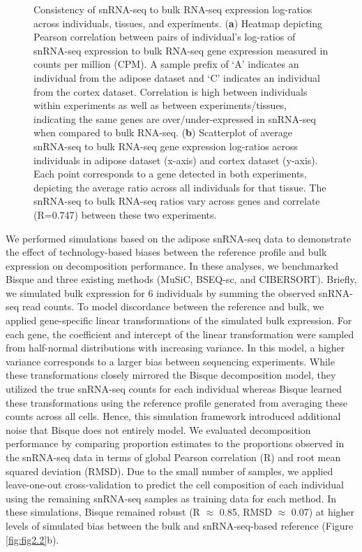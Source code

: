 \begin{figure}
\caption{
        Consistency of snRNA-seq to bulk RNA-seq expression log-ratios across individuals, tissues, and experiments.
        (\textbf{a}) Heatmap depicting Pearson correlation between pairs of individual’s log-ratios of snRNA-seq expression to bulk RNA-seq gene expression measured in counts per million (CPM). A sample prefix of ‘A’ indicates an individual from the adipose dataset and ‘C’ indicates an individual from the cortex dataset. Correlation is high between individuals within experiments as well as between experiments/tissues, indicating the same genes are over/under-expressed in snRNA-seq when compared to bulk RNA-seq.
        (\textbf{b}) Scatterplot of average snRNA-seq to bulk RNA-seq gene expression log-ratios across individuals in adipose dataset (x-axis) and cortex dataset (y-axis). Each point corresponds to a gene detected in both experiments, depicting the average ratio across all individuals for that tissue. The snRNA-seq to bulk RNA-seq ratios vary across genes and correlate (R=0.747) between these two experiments.
        }
\label{fig:supfig2.3}
\end{figure}

We performed simulations based on the adipose snRNA-seq data to demonstrate the effect of technology-based biases between the reference profile and bulk expression on decomposition performance. In these analyses, we benchmarked Bisque and three existing methods (MuSiC, BSEQ-sc, and CIBERSORT). Briefly, we simulated bulk expression for 6 individuals by summing the observed snRNA-seq read counts. To model discordance between the reference and bulk, we applied gene-specific linear transformations of the simulated bulk expression. For each gene, the coefficient and intercept of the linear transformation were sampled from half-normal distributions with increasing variance. In this model, a higher variance corresponds to a larger bias between sequencing experiments. While these transformations closely mirrored the Bisque decomposition model, they utilized the true snRNA-seq counts for each individual whereas Bisque learned these transformations using the reference profile generated from averaging these counts across all cells. Hence, this simulation framework introduced additional noise that Bisque does not entirely model. We evaluated decomposition performance by comparing proportion estimates to the proportions observed in the snRNA-seq data in terms of global Pearson correlation (R) and root mean squared deviation (RMSD). Due to the small number of samples, we applied leave-one-out cross-validation to predict the cell composition of each individual using the remaining snRNA-seq samples as training data for each method. In these simulations, Bisque remained robust (R $\approx$ 0.85, RMSD $\approx$ 0.07) at higher levels of simulated bias between the bulk and snRNA-seq-based reference (Figure \ref{fig:fig2.2}b).

